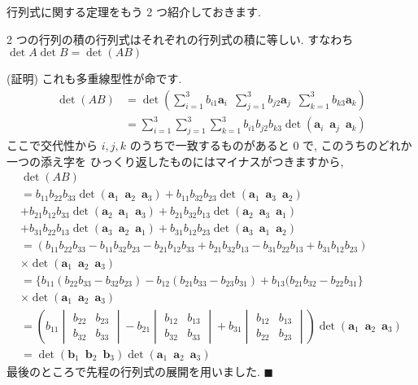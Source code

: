 \documentclass[openany, a4paper, oneside]{jsbook}
\begin{document}
行列式に関する定理をもう 2 つ紹介しておきます.
\begin{thm}2 つの行列の積の行列式はそれぞれの行列式の積に等しい. すなわち $\det A \det B = \det (AB)$
\end{thm}
(証明) これも多重線型性が命です.
\begin{align}
    \det (AB) &= \det \left ( \sum_{i=1}^3 b_{i1}\bm{a}_i
                    \,\,\, \sum_{j=1}^3 b_{j2}\bm{a}_j  \,\,\, \sum_{k=1}^3 b_{k3}\bm{a}_k \right) \\
              &= \sum_{i=1}^3 \sum_{j=1}^3 \sum_{k=1}^3 b_{i1} b_{j2} b_{k3}
                            \det (\bm{a}_i \,\,\, \bm{a}_j \,\,\, \bm{a}_k )
\end{align}
ここで交代性から $i,j,k$ のうちで一致するものがあると 0 で, このうちのどれか一つの添え字を
ひっくり返したものにはマイナスがつきますから,
\begin{gather}
 \det (AB) \\
 =  b_{11} b_{22} b_{33} \det (\bm{a}_1 \,\,\, \bm{a}_2 \,\,\, \bm{a}_3 )
 +b_{11} b_{32} b_{23} \det (\bm{a}_1 \,\,\, \bm{a}_3 \,\,\, \bm{a}_2 ) \\
 +b_{21} b_{12} b_{33} \det (\bm{a}_2 \,\,\, \bm{a}_1 \,\,\, \bm{a}_3 )
 +b_{21} b_{32} b_{13} \det (\bm{a}_2 \,\,\, \bm{a}_3 \,\,\, \bm{a}_1 ) \\
 +b_{31} b_{22} b_{13} \det (\bm{a}_3 \,\,\, \bm{a}_2 \,\,\, \bm{a}_1 )
 +b_{31} b_{12} b_{23} \det (\bm{a}_3 \,\,\, \bm{a}_1 \,\,\, \bm{a}_2 ) \\
 =
 ( b_{11} b_{22} b_{33} - b_{11} b_{32} b_{23} - b_{21} b_{12} b_{33}
 +b_{21} b_{32} b_{13} - b_{31} b_{22} b_{13} + b_{31} b_{12} b_{23} ) \\
 \times \det (\bm{a}_1 \,\,\, \bm{a}_2 \,\,\, \bm{a}_3 ) \\
 = \{ b_{11}(b_{22}b_{33} - b_{32}b_{23}) - b_{12}(b_{21}b_{33} - b_{23}b_{31})
 +b_{13}(b_{21}b_{32} - b_{22}b_{31}  \} \\ \times \det (\bm{a}_1 \,\,\, \bm{a}_2 \,\,\, \bm{a}_3 ) \\
 =
 \left ( b_{11} \begin{vmatrix} b_{22} & b_{23}  \\
 b_{32} & b_{33}
 \end{vmatrix}
  -b_{21} \begin{vmatrix} b_{12} & b_{13} \\
  b_{32} & b_{33}
 \end{vmatrix}
 +b_{31} \begin{vmatrix} b_{12} & b_{13} \\
 b_{22} & b_{23}
 \end{vmatrix}
 \right) \det (\bm{a}_1 \,\,\, \bm{a}_2 \,\,\, \bm{a}_3 ) \\
 = \det (\bm{b}_1 \,\,\, \bm{b}_2 \,\,\, \bm{b}_3 )\det (\bm{a}_1 \,\,\, \bm{a}_2 \,\,\, \bm{a}_3 )
\end{gather}
最後のところで先程の行列式の展開を用いました.  $\blacksquare$
\end{document}
